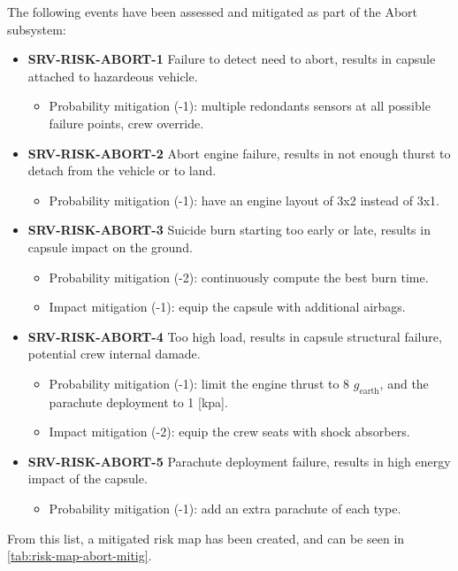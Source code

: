 \noindent The following events have been assessed and mitigated as part of the Abort subsystem:

\begin{itemize}
	 \item \textbf{SRV-RISK-ABORT-1} Failure to detect need to abort, results in capsule attached to hazardeous vehicle.
	\begin{itemize}
		 \item Probability mitigation (-1): multiple redondants sensors at all possible failure points, crew override.	\end{itemize}
	 \item \textbf{SRV-RISK-ABORT-2} Abort engine failure, results in not enough thurst to detach from the vehicle or to land.
	\begin{itemize}
		 \item Probability mitigation (-1): have an engine layout of 3x2 instead of 3x1.	\end{itemize}
	 \item \textbf{SRV-RISK-ABORT-3} Suicide burn starting too early or late, results in capsule impact on the ground.
	\begin{itemize}
		 \item Probability mitigation (-2): continuously compute the best burn time.		 \item Impact mitigation (-1): equip the capsule with additional airbags.	\end{itemize}
	 \item \textbf{SRV-RISK-ABORT-4} Too high load, results in capsule structural failure, potential crew internal damade.
	\begin{itemize}
		 \item Probability mitigation (-1): limit the engine thrust to 8 $g_\textrm{{earth}}$, and the parachute deployment to 1 [kpa].		 \item Impact mitigation (-2): equip the crew seats with shock absorbers.	\end{itemize}
	 \item \textbf{SRV-RISK-ABORT-5} Parachute deployment failure, results in high energy impact of the capsule.
	\begin{itemize}
		 \item Probability mitigation (-1): add an extra parachute of each type.	\end{itemize}
\end{itemize}

\noindent From this list, a mitigated risk map has been created, and can be seen in \autoref{tab:risk-map-abort-mitig}.

